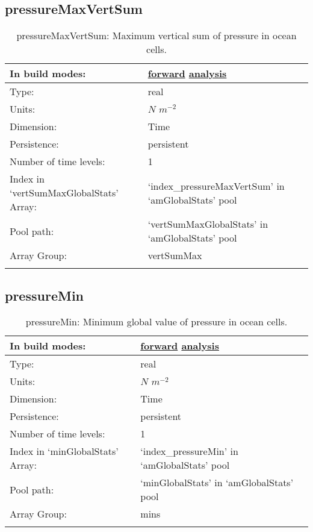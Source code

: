 \subsection[pressureMaxVertSum]{pressureMaxVertSum}
\label{subsec:var_sec_amGlobalStats_pressureMaxVertSum}
\begin{center}
\begin{longtable}{| p{2.0in} | p{4.0in} |}
        \hline 
        In build modes: & \hyperref[subsec:forward_var_tab_amGlobalStats]{forward} \hyperref[subsec:analysis_var_tab_amGlobalStats]{analysis} \\
        \hline 
        Type: & real \\
        \hline 
        Units: & $N$ $m^{-2}$ \\
        \hline 
        Dimension: & Time \\
        \hline 
        Persistence: & persistent \\
        \hline 
        Number of time levels: & 1 \\
        \hline 
		 Index in `vertSumMaxGlobalStats' Array: & `index\_pressureMaxVertSum' in `amGlobalStats' pool \\
		 \hline 
            Pool path: & `vertSumMaxGlobalStats' in `amGlobalStats' pool \\
		 \hline 
		 Array Group: & vertSumMax \\
		 \hline 
    \caption{pressureMaxVertSum: Maximum vertical sum of pressure in ocean cells.}
\end{longtable}
\end{center}
\subsection[pressureMin]{pressureMin}
\label{subsec:var_sec_amGlobalStats_pressureMin}
\begin{center}
\begin{longtable}{| p{2.0in} | p{4.0in} |}
        \hline 
        In build modes: & \hyperref[subsec:forward_var_tab_amGlobalStats]{forward} \hyperref[subsec:analysis_var_tab_amGlobalStats]{analysis} \\
        \hline 
        Type: & real \\
        \hline 
        Units: & $N$ $m^{-2}$ \\
        \hline 
        Dimension: & Time \\
        \hline 
        Persistence: & persistent \\
        \hline 
        Number of time levels: & 1 \\
        \hline 
		 Index in `minGlobalStats' Array: & `index\_pressureMin' in `amGlobalStats' pool \\
		 \hline 
            Pool path: & `minGlobalStats' in `amGlobalStats' pool \\
		 \hline 
		 Array Group: & mins \\
		 \hline 
    \caption{pressureMin: Minimum global value of pressure in ocean cells.}
\end{longtable}
\end{center}
